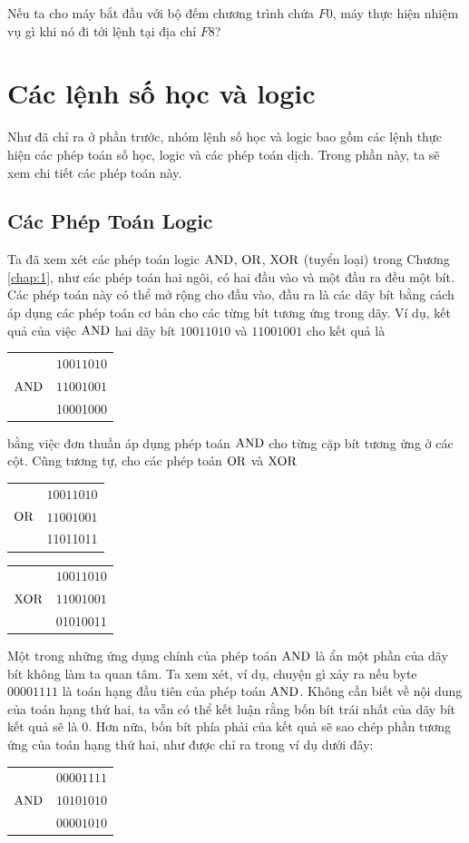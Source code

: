 \begin{enumerate}
  Nếu ta cho máy bắt đầu với bộ đếm chương trình chứa $F0$, máy thực hiện nhiệm vụ
  gì khi nó đi tới lệnh tại địa chỉ $F8$?
\end{enumerate}

\section{Các lệnh số học và logic}
\label{sec:2.4}
Như đã chỉ ra ở phần trước, nhóm lệnh số học và logic bao gồm các lệnh thực hiện các phép
toán số học, logic và các phép toán dịch. Trong phần này, ta sẽ xem chi tiết các
phép toán này.

\subsection*{Các Phép Toán Logic}
Ta đã xem xét các phép toán logic $\operatorname{\mbox{AND}}$, $\operatorname{\mbox{OR}}$, $\operatorname{\mbox{XOR}}$ (tuyển loại) trong Chương
\ref{chap:1}, như các phép toán hai ngôi, có hai đầu vào và một đầu ra đều một bít. Các
phép toán này có thể mở rộng cho đầu vào, đầu ra là các dãy bít bằng cách áp dụng các phép
toán cơ bản cho các từng bít tương ứng trong dãy. Ví dụ, kết quả của việc $\operatorname{\mbox{AND}}$ hai dãy
bít $10011010$ và $11001001$ cho kết quả là
\begin{flushleft}
  \begin{tabular}{ll}
    & $10011010$ \\
    $\operatorname{\mbox{AND}}$ & $11001001$\\
    \hline
    &10001000
  \end{tabular}
\end{flushleft}
bằng việc đơn thuần áp dụng phép toán $\operatorname{\mbox{AND}}$ cho từng cặp bít tương ứng ở các cột. Cũng
tương tự, cho các phép toán $\operatorname{\mbox{OR}}$ và $\operatorname{\mbox{XOR}}$
\begin{flushleft}
  \begin{tabular}{ll}
    & $10011010$ \\
    $\operatorname{\mbox{OR}}$ & $11001001$\\
    \hline
    &11011011
  \end{tabular}
  \qquad \qquad \qquad
  \begin{tabular}{ll}
    & $10011010$ \\
    $\operatorname{\mbox{XOR}}$ & $11001001$\\
    \hline
    &01010011
  \end{tabular}
\end{flushleft}

Một trong những ứng dụng chính của phép toán $\operatorname{\mbox{AND}}$ là ẩn một phần của dãy bít không làm
ta quan tâm. Ta xem xét, ví dụ, chuyện gì xảy ra nếu byte $00001111$ là toán hạng
đầu tiên của phép toán $\operatorname{\mbox{AND}}$. Không cần biết về nội dung của toán hạng thứ hai, ta
vẫn có thể kết luận rằng bốn bít trái nhất của dãy bít kết quả sẽ là $0$. Hơn nữa, bốn bít
phía phải của kết quả sẽ sao chép phần tương ứng của toán hạng thứ hai, như được chỉ ra
trong ví dụ dưới đây:
\begin{flushleft}
  \begin{tabular}{ll}
    & $00001111$ \\
    $\operatorname{\mbox{AND}}$ & $10101010$\\
    \hline
    &$00001010$
  \end{tabular}
\end{flushleft}

